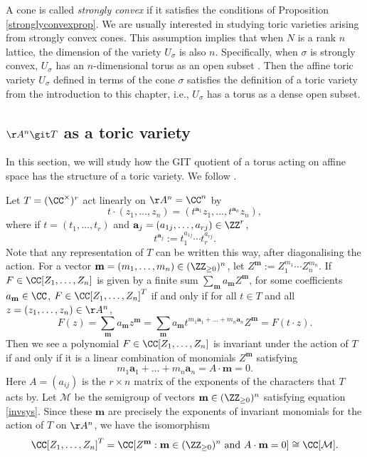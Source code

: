 \documentclass[12pt]{amsart}
\newcommand{\todo}[1]{\noindent  \textcolor{blue}{To do: #1}}
\theoremstyle{plain}
\begin{document}
A cone is called \emph{strongly convex} if it satisfies the conditions of Proposition \ref{stronglyconvexprop}.
We are usually interested in studying toric varieties arising from strongly convex cones.
This assumption implies that when $N$ is a rank $n$ lattice, the dimension of the variety $U_\sigma$ is also $n$.
Specifically, when $\sigma$ is strongly convex, $U_\sigma$ has an $n$-dimensional torus as an open subset \cite[Theorem 1.2.18]{CLS11}.
Then the affine toric variety $U_\sigma$ defined in terms of the cone $\sigma$ satisfies the definition of a toric variety from the introduction to this chapter, i.e., $U_\sigma$ has a torus as a dense open subset.

\subsection{$\AA^n \git T$ as a toric variety}
In this section, we will study how the GIT quotient of a torus acting on affine space has the structure of a toric variety.
We follow \cite[\S 12]{Dolgachev03}.

Let $T = (\CC^\times)^r$ act linearly on $\AA^n = \CC^n$ by
$$t \cdot (z_1, \ldots, z_n) = (t^{\mathbf{a}_1} z_1, \ldots, t^{\mathbf{a}_n} z_n),$$
where if $t = (t_1, \ldots, t_r)$ and $\mathbf{a}_j = (a_{1j}, \ldots, a_{rj}) \in \ZZ^r$,
$$t^{\mathbf{a}_j} := t_1^{a_{1j}} \cdots t_r^{a_{rj}}.$$
Note that any representation of $T$ can be written this way, after diagonalising the action.
For a vector $\mathbf{m} =(m_1, \ldots, m_n) \in (\ZZ_{\ge 0})^n$, let $Z^\mathbf{m}:=Z_1^{m_1} \cdots Z_n^{m_n}$.
If $F \in \CC[Z_1, \ldots, Z_n]$ is given by a finite sum $\sum_{\mathbf{m}} a_{\mathbf{m}} Z^\mathbf{m}$, for some coefficients $a_{\mathbf{m}} \in \CC$, $F \in \CC[Z_1, \ldots, Z_n]^T$ if and only if for all $t \in T$ and all $z =(z_1,\ldots,z_n)\in\AA^n$,
$$F(z) = \sum_{\mathbf{m}} a_{\mathbf{m}} z^\mathbf{m} = \sum_{\mathbf{m}} a_{\mathbf{m}} t^{m_1 \mathbf{a}_1 + \ldots + m_n \mathbf{a}_n} Z^\mathbf{m} = F(t \cdot z).$$
Then we see a polynomial $F \in \CC[Z_1, \ldots, Z_n]$ is invariant under the action of $T$ if and only if it is a linear combination of monomials $Z^\mathbf{m}$ satisfying
\begin{equation}\label{invsys}
	m_1 \mathbf{a}_1 + \ldots + m_n \mathbf{a}_n = A \cdot \mathbf{m} = 0.
\end{equation}
Here $A = (a_{ij})$ is the $r \times n$ matrix of the exponents of the characters that $T$ acts by.       %
Let $\mathcal{M}$ be the semigroup of vectors $\mathbf{m} \in (\ZZ_{\ge 0})^n$ satisfying equation \ref{invsys}.
Since these $\mathbf{m}$ are precisely the exponents of invariant monomials for the action of $T$ on $\AA^n$, we have the isomorphism
$$\CC[Z_1, \ldots, Z_n]^T = \CC[Z^\mathbf{m} : \mathbf{m}\in (\ZZ_{\ge 0})^n \text{ and } A \cdot \mathbf{m} = 0] \cong \CC[\mathcal{M}].$$
\end{document}
